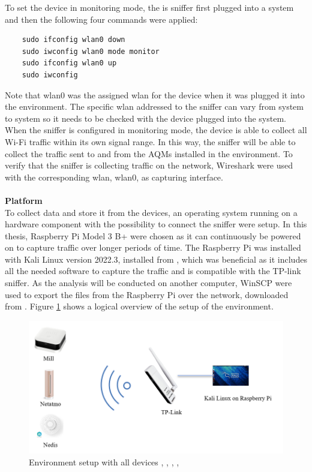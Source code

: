 To set the device in monitoring mode, the is sniffer first plugged into a system and then the following four commands were applied:

\begin{verbatim}
    sudo ifconfig wlan0 down
    sudo iwconfig wlan0 mode monitor
    sudo ifconfig wlan0 up
    sudo iwconfig
\end{verbatim}

Note that wlan0 was the assigned wlan for the device when it was plugged it into the environment. The specific wlan addressed to the sniffer can vary from system to system so it needs to be checked with the device plugged into the system. When the sniffer is configured in monitoring mode, the device is able to collect all \gls{Wi-Fi} traffic within its own signal range. In this way, the sniffer will be able to collect the traffic sent to and from the \gls{AQM}s installed in the environment. To verify that the sniffer is collecting traffic on the network, Wireshark were used with the corresponding wlan, wlan0, as capturing interface. 
\\\\
\noindent
\textbf{Platform}\\
To collect data and store it from the devices, an operating system running on a hardware component with the possibility to connect the sniffer were setup. In this thesis, Raspberry Pi Model 3 B+ were chosen as it can continuously be powered on to capture traffic over longer periods of time. The Raspberry Pi was installed with Kali Linux version 2022.3, installed from \cite{KaliLinux}, which was beneficial as it includes all the needed software to capture the traffic and is compatible with the TP-link sniffer. As the analysis will be conducted on another computer, WinSCP were used to export the files from the Raspberry Pi over the network, downloaded from \cite{WinSCP}. Figure \ref{fig:Environment} shows a logical overview of the setup of the environment.  

\begin{figure} [H]
    \centering
    \includegraphics[width=1\textwidth]{figures/Environment.png}
    \caption{Environment setup with all devices \cite{MillSense}, \cite{NetatmoDevice}, \cite{NedisDevice}, \cite{Sniffer}, \cite{KaliLinux}}
    \label{fig:Environment}
\end{figure}

